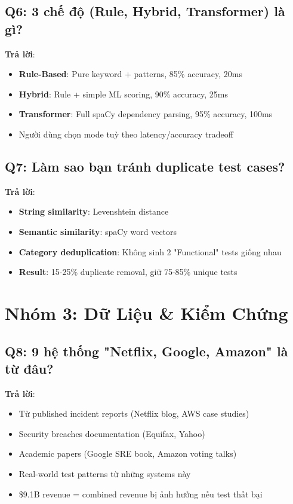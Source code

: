 \documentclass[12pt,a4paper]{report}
\begin{document}
\subsection{Q6: 3 chế độ (Rule, Hybrid, Transformer) là gì?}

\textbf{Trả lời}:
\begin{itemize}
    \item \textbf{Rule-Based}: Pure keyword + patterns, 85\% accuracy, 20ms
    \item \textbf{Hybrid}: Rule + simple ML scoring, 90\% accuracy, 25ms
    \item \textbf{Transformer}: Full spaCy dependency parsing, 95\% accuracy, 100ms
    \item Người dùng chọn mode tuỳ theo latency/accuracy tradeoff
\end{itemize}

\subsection{Q7: Làm sao bạn tránh duplicate test cases?}

\textbf{Trả lời}:
\begin{itemize}
    \item \textbf{String similarity}: Levenshtein distance
    \item \textbf{Semantic similarity}: spaCy word vectors
    \item \textbf{Category deduplication}: Không sinh 2 "Functional" tests giống nhau
    \item \textbf{Result}: 15-25\% duplicate removal, giữ 75-85\% unique tests
\end{itemize}

\section{Nhóm 3: Dữ Liệu & Kiểm Chứng}

\subsection{Q8: 9 hệ thống "Netflix, Google, Amazon" là từ đâu?}

\textbf{Trả lời}:
\begin{itemize}
    \item Từ published incident reports (Netflix blog, AWS case studies)
    \item Security breaches documentation (Equifax, Yahoo)
    \item Academic papers (Google SRE book, Amazon voting talks)
    \item Real-world test patterns từ những systems này
    \item \$9.1B revenue = combined revenue bị ảnh hưởng nếu test thất bại
\end{itemize}
\end{document}
